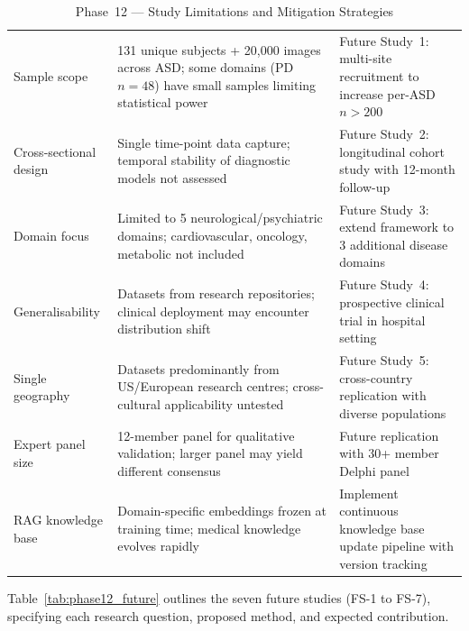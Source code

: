 \begingroup\singlespacing\tablefontsize\tablestripes
\begin{xltabular}{\textwidth}{@{} l X X @{}}
\caption{Phase~12 --- Study Limitations and Mitigation Strategies}
\label{tab:phase12_limitations}\\
\toprule
{} &  &  \\
\midrule
\endfirsthead
\endhead
\bottomrule
\endlastfoot
Sample scope           & 131 unique subjects + 20{,}000 images across ASD; some domains (PD $n = 48$) have small samples limiting statistical power & Future Study~1: multi-site recruitment to increase per-ASD $n > 200$ \\
\addlinespace
Cross-sectional design & Single time-point data capture; temporal stability of diagnostic models not assessed                     & Future Study~2: longitudinal cohort study with 12-month follow-up \\
\addlinespace
Domain focus           & Limited to 5 neurological/psychiatric domains; cardiovascular, oncology, metabolic not included          & Future Study~3: extend framework to 3 additional disease domains \\
\addlinespace
Generalisability       & Datasets from research repositories; clinical deployment may encounter distribution shift                & Future Study~4: prospective clinical trial in hospital setting \\
\addlinespace
Single geography       & Datasets predominantly from US/European research centres; cross-cultural applicability untested          & Future Study~5: cross-country replication with diverse populations \\
\addlinespace
Expert panel size      & 12-member panel for qualitative validation; larger panel may yield different consensus                   & Future replication with 30+ member Delphi panel \\
\addlinespace
RAG knowledge base     & Domain-specific embeddings frozen at training time; medical knowledge evolves rapidly                    & Implement continuous knowledge base update pipeline with version tracking \\
\end{xltabular}
\endgroup

\vspace{1.5em}

Table~\ref{tab:phase12_future} outlines the seven future studies (FS-1 to FS-7), specifying each research question, proposed method, and expected contribution.

